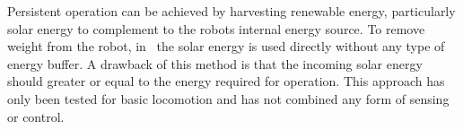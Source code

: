 Persistent operation can be achieved by harvesting renewable energy, particularly solar energy to complement to the robots internal energy source. 
To remove weight from the robot, in~\cite{bruhwiler_iros_2015} the solar energy is used directly without any type of energy buffer. 
A drawback of this method is that the incoming solar energy should greater or equal to the energy required for operation. 
This approach has only been tested for basic locomotion and has not combined any form of sensing or control.




